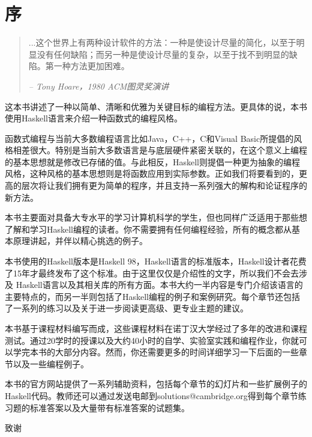 
\chapter*{序}
\begin{quotation}
...这个世界上有两种设计软件的方法：一种是使设计尽量的简化，以至于明显没有任何缺陷；而另一种是使设计尽量的复杂，以至于找不到明显的缺陷。第一种方法更加困难。
\begin{flushright}
\textit{ -- Tony Hoare，1980 ACM图灵奖演讲}                 %
\end{flushright}
\end{quotation}
这本书讲述了一种以简单、清晰和优雅为关键目标的编程方法。更具体的说，本书使用Haskell语言来介绍一种函数式的编程风格。

函数式编程与当前大多数编程语言比如Java，C++，C和Visual
Basic所提倡的风格相差很大。特别是当前大多数语言是与底层硬件紧密关联的，在这个意义上编程的基本思想就是修改已存储的值。与此相反，Haskell则提倡一种更为抽象的编程风格，这种风格的基本思想则是将函数应用到实际参数。正如我们将要看到的，更高的层次将让我们拥有更为简单的程序，并且支持一系列强大的解构和论证程序的新方法。

本书主要面对具备大专水平的学习计算机科学的学生，但也同样广泛适用于那些想了解和学习Haskell编程的读者。你不需要拥有任何编程经验，所有的概念都从基本原理讲起，并伴以精心挑选的例子。

本书使用的Haskell版本是Haskell 98，Haskell语言的标准版本，Haskell设计者花费了15年才最终发布了这个标准。由于这里仅仅是介绍性的文字，所以我们不会去涉及
Haskell语言以及其相关库的所有方面。本书大约一半内容是专门介绍该语言的主要特点的，而另一半则包括了Haskell编程的例子和案例研究。每个章节还包括了一系列的练习以及关于进一步阅读更高级、更专业主题的建议。

本书基于课程材料编写而成，这些课程材料在诺丁汉大学经过了多年的改进和课程测试。通过20学时的授课以及大约40小时的自学、实验室实践和编程作业，你就可以学完本书的大部分内容。然而，你还需要更多的时间详细学习一下后面的一些章节以及一些编程例子。

本书的官方网站提供了一系列辅助资料，包括每个章节的幻灯片和一些扩展例子的Haskell代码。教师还可以通过发送电邮到solutions@cambridge.org得到每个章节练习题的标准答案以及大量带有标准答案的试题集。

\begin{flushleft}
致谢\\
\end{flushleft}

